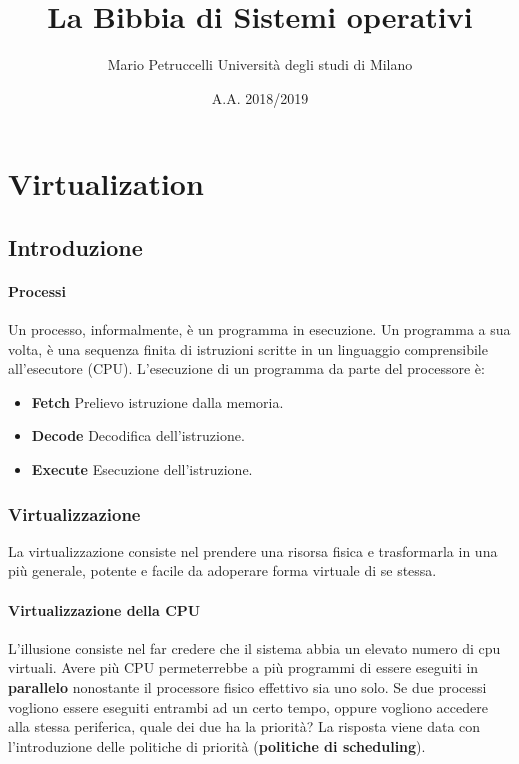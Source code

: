 \documentclass[12pt, twoside, letterpaper]{article}
\title{La Bibbia di Sistemi operativi}
\author{Mario Petruccelli \cr Università degli studi di Milano}
\date{A.A. 2018/2019}
\begin{document}
	\begin{titlepage} \maketitle \newpage \tableofcontents \end{titlepage}
	
	\section{Virtualization}
		
		\subsection{Introduzione}
		
			\paragraph{Processi} Un processo, informalmente, è un programma in esecuzione. Un programma a sua volta, è una sequenza finita di istruzioni scritte in un linguaggio comprensibile all'esecutore (CPU).
				L'esecuzione di un programma da parte del processore è:
				\begin{itemize}
					\item \textbf{Fetch} Prelievo istruzione dalla memoria.
					\item \textbf{Decode} Decodifica dell'istruzione.
					\item \textbf{Execute} Esecuzione dell'istruzione.
				\end{itemize}
			
			\subsubsection{Virtualizzazione} La virtualizzazione consiste nel prendere una risorsa fisica e trasformarla in una più generale, potente e facile da adoperare forma virtuale di se stessa. 
			
				\paragraph{Virtualizzazione della CPU} L'illusione consiste nel far credere che il sistema abbia un elevato numero di cpu virtuali. Avere più CPU permeterrebbe a più programmi di essere eseguiti in \textbf{parallelo} nonostante il processore fisico effettivo sia uno solo. Se due processi vogliono essere eseguiti entrambi ad un certo tempo, oppure vogliono accedere alla stessa periferica, quale dei due ha la priorità? La risposta viene data con l'introduzione delle politiche di priorità (\textbf{politiche di scheduling}).
			
\end{document}
